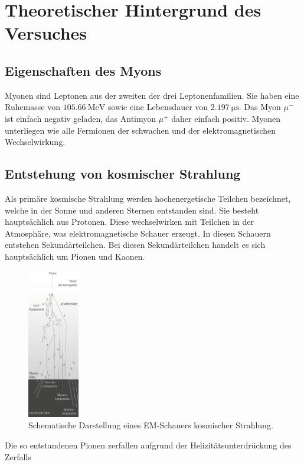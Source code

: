 \section{Theoretischer Hintergrund des Versuches}
\label{sec:Theorie}
\subsection{Eigenschaften des Myons}
\label{subsec:Eigenschaften}
Myonen sind Leptonen aus der zweiten der drei Leptonenfamilien. Sie haben
eine Ruhemasse von $\SI{105.66}{\mega\electronvolt}$ sowie eine Lebensdauer
von $\SI{2.197}{\micro\second}$. Das Myon $\mu^{-}$ ist einfach negativ geladen,
das Antimyon $\mu^{+}$ daher einfach positiv.\cite{PDG}
Myonen unterliegen wie alle Fermionen der schwachen und der elektromagnetischen
Wechselwirkung.
\subsection{Entstehung von kosmischer Strahlung}
\label{subsec:kosmischeStrahlung}
Als primäre kosmische Strahlung werden hochenergetische Teilchen bezeichnet, welche
in der Sonne und anderen Sternen entstanden sind. Sie besteht hauptsächlich aus Protonen.
Diese wechselwirken mit Teilchen in der Atmosphäre, was elektromagnetische
Schauer erzeugt. In diesen Schauern entstehen Sekundärteilchen. Bei diesen
Sekundärteilchen handelt es sich hauptsächlich um Pionen und Kaonen.
\begin{figure}
  \centering
  \includegraphics[width=0.2\textwidth]{pictures/Schauer.png}
  \caption{Schematische Darstellung eines EM-Schauers kosmischer Strahlung. \cite{Q1}}
  \label{fig:schauer}
\end{figure}
\noindent
Die so entstandenen Pionen zerfallen aufgrund der Helizitätsunterdrückung
des Zerfalls
